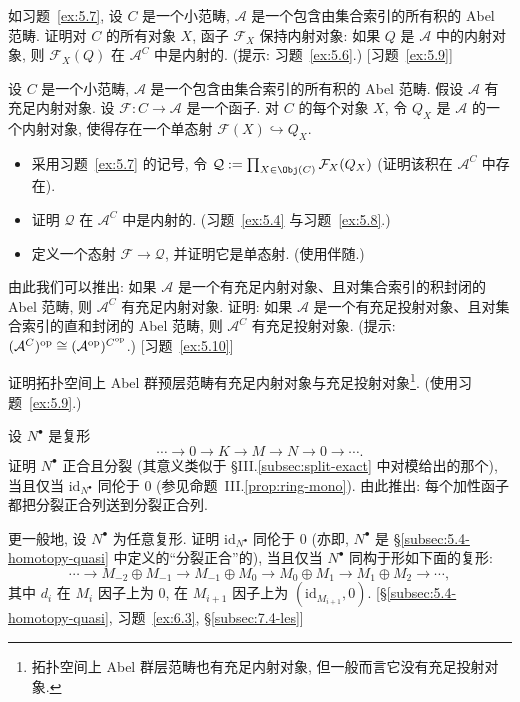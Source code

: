 \begin{prob}\label{ex:5.8}
如习题~\ref{ex:5.7}, 设 $C$ 是一个小范畴, $\mathcal{A}$ 是一个包含由集合索引的所有积的 Abel 范畴. 证明对 $C$ 的所有对象 $X$, 函子 $\mathcal{F}_X$ 保持内射对象: 如果 $Q$ 是 $\mathcal{A}$ 中的内射对象, 则 $\mathcal{F}_X(Q)$ 在 $\mathcal{A}^C$ 中是内射的. (提示: 习题~\ref{ex:5.6}.) [习题~\ref{ex:5.9}]
\end{prob}

\begin{prob}\label{ex:5.9}
设 $C$ 是一个小范畴, $\mathcal{A}$ 是一个包含由集合索引的所有积的 Abel 范畴. 假设 $\mathcal{A}$ 有充足内射对象. 设 $\mathcal{F}:C\to\mathcal{A}$ 是一个函子. 对 $C$ 的每个对象 $X$, 令 $Q_X$ 是 $\mathcal{A}$ 的一个内射对象, 使得存在一个单态射 $\mathcal{F}(X)\hookrightarrow Q_X$.
\begin{itemize}
\item 采用习题~\ref{ex:5.7} 的记号, 令 $\mathcal{Q}:=\prod_{X\in\Obj(C)}\mathcal{F}_X(Q_X)$ (证明该积在 $\mathcal{A}^C$ 中存在).
\item 证明 $\mathcal{Q}$ 在 $\mathcal{A}^C$ 中是内射的. (习题~\ref{ex:5.4} 与习题~\ref{ex:5.8}.)
\item 定义一个态射 $\mathcal{F}\to\mathcal{Q}$, 并证明它是单态射. (使用伴随.)
\end{itemize}
由此我们可以推出: 如果 $\mathcal{A}$ 是一个有充足内射对象、且对集合索引的积封闭的 Abel 范畴, 则 $\mathcal{A}^C$ 有充足内射对象. 证明: 如果 $\mathcal{A}$ 是一个有充足投射对象、且对集合索引的直和封闭的 Abel 范畴, 则 $\mathcal{A}^C$ 有充足投射对象. (提示: $(\mathcal{A}^C)^{\mathrm{op}}\cong(\mathcal{A}^{\mathrm{op}})^{C^{\mathrm{op}}}$.) [习题~\ref{ex:5.10}]
\end{prob}

\begin{prob}\label{ex:5.10}
证明拓扑空间上 Abel 群预层范畴有充足内射对象与充足投射对象\footnote{拓扑空间上 Abel 群层范畴也有充足内射对象, 但一般而言它没有充足投射对象.}. (使用习题~\ref{ex:5.9}.)
\end{prob}

\begin{prob}\label{ex:5.11}
设 $N^\bullet$ 是复形
\[
\cdots\longrightarrow 0\longrightarrow K\longrightarrow M\longrightarrow N\longrightarrow 0\longrightarrow\cdots.
\]
证明 $N^\bullet$ 正合且分裂 (其意义类似于 §III.\ref{subsec:split-exact} 中对模给出的那个), 当且仅当 $\mathrm{id}_{N^\bullet}$ 同伦于 $0$ (参见命题~III.\ref{prop:ring-mono}). 由此推出: 每个加性函子都把分裂正合列送到分裂正合列.

更一般地, 设 $N^\bullet$ 为任意复形. 证明 $\mathrm{id}_{N^\bullet}$ 同伦于 $0$ (亦即, $N^\bullet$ 是 §\ref{subsec:5.4-homotopy-quasi} 中定义的``分裂正合''的), 当且仅当 $N^\bullet$ 同构于形如下面的复形:
\[
\cdots\longrightarrow M_{-2}\oplus M_{-1}\longrightarrow M_{-1}\oplus M_0\longrightarrow M_0\oplus M_1\longrightarrow M_1\oplus M_2\longrightarrow\cdots,
\]
其中 $d_i$ 在 $M_i$ 因子上为 $0$, 在 $M_{i+1}$ 因子上为 $(\mathrm{id}_{M_{i+1}},0)$. [\S\ref{subsec:5.4-homotopy-quasi}, 习题~\ref{ex:6.3}, \S\ref{subsec:7.4-les}]
\end{prob}

